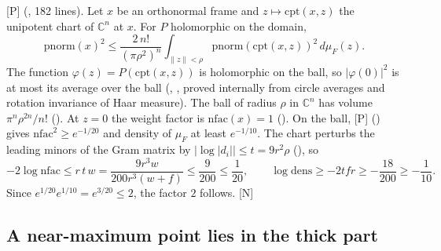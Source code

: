 \documentclass[11pt]{article}
\newcommand{\mP}{\textsf{[P]}}
\newcommand{\mN}{\textsf{[N]}}
\theoremstyle{remark}
\begin{document}
\mP{}  (, 182 lines). Let $x$ be an orthonormal frame and $z\mapsto\mathrm{cpt}(x,z)$ the unipotent chart of $\mathbb C^n$ at $x$. For $P$ holomorphic on the domain,
\[
\mathrm{pnorm}(x)^2\le\frac{2\,n!}{(\pi\rho^2)^n}\int_{\lVert z\rVert<\rho}\mathrm{pnorm}(\mathrm{cpt}(x,z))^2\,d\mu_F(z).
\]
The function $\varphi(z)=P(\mathrm{cpt}(x,z))$ is holomorphic on the ball, so $\lvert\varphi(0)\rvert^2$ is at most its average over the ball (, , proved internally from circle averages and rotation invariance of Haar measure). The ball of radius $\rho$ in $\mathbb C^n$ has volume $\pi^n\rho^{2n}/n!$ (). At $z=0$ the weight factor is $\mathrm{nfac}(x)=1$ (). On the ball, \mP{}  () gives $\mathrm{nfac}^2\ge e^{-1/20}$ and density of $\mu_F$ at least $e^{-1/10}$. The chart perturbs the leading minors of the Gram matrix by $\lvert\log\lvert d_i\rvert\rvert\le t=9r^2\rho$ (), so
\[
-2\log\mathrm{nfac}\le r\,t\,w=\frac{9r^3w}{200r^3(w+f)}\le\frac9{200}\le\frac1{20},\qquad
\log\mathrm{dens}\ge-2tfr\ge-\frac{18}{200}\ge-\frac1{10}.
\]
Since $e^{1/20}e^{1/10}=e^{3/20}\le2$, the factor $2$ follows. \mN{}

\subsection{A near-maximum point lies in the thick part}
\end{document}
